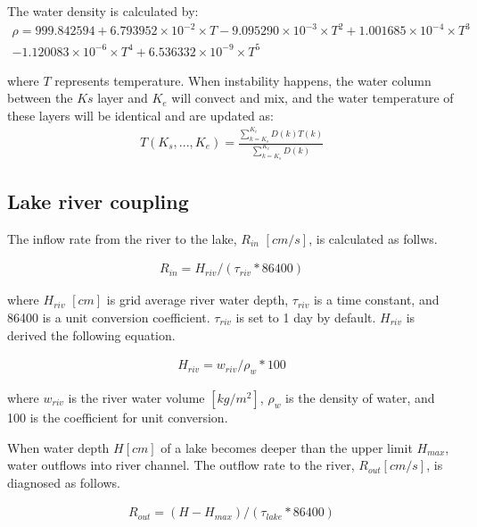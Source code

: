 The water density is calculated by: \begin{eqnarray}
\rho =999.842594+6.793952\times 10^{-2}\times T-9.095290\times 10^{-3}\times T^{2}+1.001685\times
      10^{-4}\times T^{3}\\ -1.120083\times 10^{-6}\times T^{4}+6.536332\times 10^{-9}\times T^{5}
\end{eqnarray}

where \(T\) represents temperature. When instability happens, the water column between the \(Ks\) layer and \(K_{e}\) will convect and mix, and the water temperature of these layers will be identical
and are updated as: \begin{eqnarray}
T(K_{s}, ..., K_{e})=\frac{\sum_{k=K_{s}}^{K_{e}}D(k)T(k)}{\sum_{k=K_{s}}^{K_{e}}D(k)}
\end{eqnarray}

\hypertarget{lake-river-coupling}{%
\subsection{Lake river coupling}\label{lake-river-coupling}}

The inflow rate from the river to the lake, \(R_{in}\) \([cm/s]\), is calculated as follws.

\begin{eqnarray}
    R_{in} = H_{riv} / (\tau_{riv} * 86400)
\end{eqnarray}

where \(H_{riv}\) \([cm]\) is grid average river water depth, \(\tau_{riv}\) is a time constant, and 86400 is a unit conversion coefficient. \(\tau_{riv}\) is set to 1 day by default. \(H_{riv}\) is
derived the following equation.

\begin{eqnarray}
    H_{riv} = w_{riv} / \rho_w * 100
\end{eqnarray}

where \(w_{riv}\) is the river water volume \([kg/m^2]\), \(\rho_w\) is the density of water, and 100 is the coefficient for unit conversion.

When water depth \(H [cm]\) of a lake becomes deeper than the upper limit \(H_{max}\), water outflows into river channel. The outflow rate to the river, \(R_{out} [cm/s]\), is diagnosed as follows.

\begin{eqnarray}
    R_{out} = (H - H_{max}) / ( \tau_{lake} * 86400 )
\end{eqnarray}

